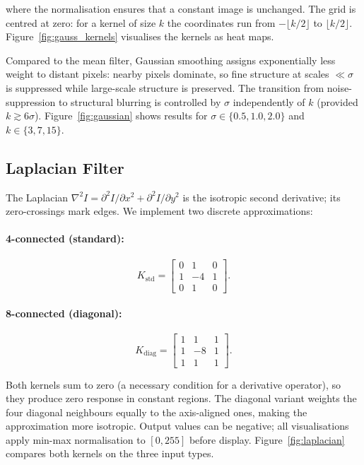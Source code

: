 \documentclass{article}
\begin{document}
where the normalisation ensures that a constant image is unchanged.
The grid is centred at zero: for a kernel of size $k$ the coordinates run from
$-\lfloor k/2 \rfloor$ to $\lfloor k/2 \rfloor$.
Figure~\ref{fig:gauss_kernels} visualises the kernels as heat maps.

Compared to the mean filter, Gaussian smoothing assigns exponentially less
weight to distant pixels: nearby pixels dominate, so fine structure at scales
$\ll \sigma$ is suppressed while large-scale structure is preserved.
The transition from noise-suppression to structural blurring is controlled by
$\sigma$ independently of $k$ (provided $k \gtrsim 6\sigma$).
Figure~\ref{fig:gaussian} shows results for $\sigma \in \{0.5, 1.0, 2.0\}$
and $k \in \{3, 7, 15\}$.

\subsection{Laplacian Filter}

The Laplacian $\nabla^2 I = \partial^2 I/\partial x^2 + \partial^2 I/\partial y^2$
is the isotropic second derivative; its zero-crossings mark edges.
We implement two discrete approximations:

\paragraph{4-connected (standard):}
\begin{equation}
  K_{\text{std}} =
  \begin{bmatrix} 0 & 1 & 0 \\ 1 & -4 & 1 \\ 0 & 1 & 0 \end{bmatrix}.
\end{equation}

\paragraph{8-connected (diagonal):}
\begin{equation}
  K_{\text{diag}} =
  \begin{bmatrix} 1 & 1 & 1 \\ 1 & -8 & 1 \\ 1 & 1 & 1 \end{bmatrix}.
\end{equation}

Both kernels sum to zero (a necessary condition for a derivative operator),
so they produce zero response in constant regions.
The diagonal variant weights the four diagonal neighbours equally to the
axis-aligned ones, making the approximation more isotropic.
Output values can be negative; all visualisations apply min-max normalisation
to $[0,255]$ before display.
Figure~\ref{fig:laplacian} compares both kernels on the three input types.
\end{document}
